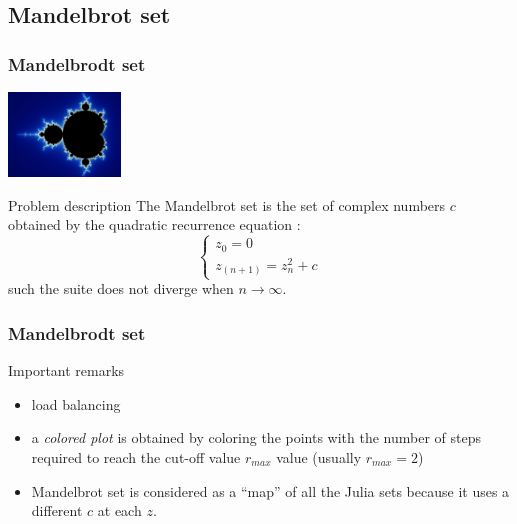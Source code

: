 \subsection{Mandelbrot set}
\begin{frame}[containsverbatim]
\frametitle{Mandelbrodt set}
\begin{center}
\includegraphics[width=3.0cm]{Day2/images/mandelbrot.jpg}
\end{center}
\begin{block}{Problem description}
The Mandelbrot set is the set of complex numbers $c$ obtained by the quadratic recurrence equation :
$$
\left\{ \begin{array}{r}
 z_0 = 0 \\
  z_{(n+1)} = z_n^2 + c
       \end{array} \right.
$$
such the suite does not diverge when $n \rightarrow \infty$. 
\end{block}
\end{frame}
\begin{frame}[containsverbatim]
\frametitle{Mandelbrodt set}
\begin{block}{Important remarks}
\begin{itemize}
	\item{load balancing}
	\item{a \textit{colored plot} is obtained by coloring the points with the number of steps required to reach the cut-off value $r_{max}$ value (usually $r_{max} = 2$)}
	\item{Mandelbrot set is considered as a ``map'' of all the Julia sets because it uses a different $c$ at each $z$.}
\end{itemize}
\end{block}
\end{frame}




